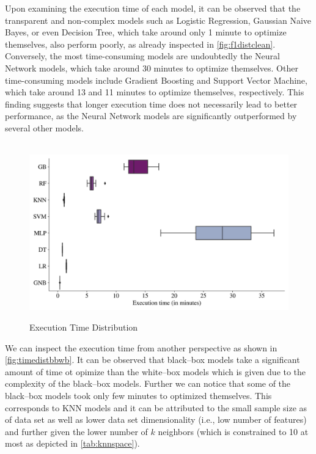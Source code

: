 Upon examining the execution time of each model, it can be observed that the transparent and non-complex models such as Logistic Regression, Gaussian Naive Bayes, or even Decision Tree, which take around only 1 minute to optimize themselves, also perform poorly, as already inspected in \autoref{fig:f1distclean}.
Conversely, the most time-consuming models are undoubtedly the Neural Network models, which take around 30 minutes to optimize themselves. Other time-consuming models include Gradient Boosting and Support Vector Machine, which take around 13 and 11 minutes to optimize themselves, respectively.
This finding suggests that longer execution time does not necessarily lead to better performance, as the Neural Network models are significantly outperformed by several other models.
\begin{figure}[H]
\centering
\caption{Execution Time Distribution}\vspace{0.5em}
\label{fig:timedist}\
\includegraphics[width=140mm]{Figures/EXECUTION_TIME_Distribution.jpg}

\vspace{-1em}
\end{figure}
We can inspect the execution time from another perspective as shown in \autoref{fig:timedistbbwb}.
It can be observed that black--box models take a significant amount of time ot opimize than the white--box models which is given due to the complexity of the black--box models.
Further we can notice that some of the black--box models took only few minutes to optimized themselves. This corresponds to KNN models and it can be attributed to the small sample size as of data set as well as lower data set dimensionality (i.e., low number of features) and further given the lower number of $k$ neighbors (which is constrained to 10 at most as depicted in \autoref{tab:knnspace}).
